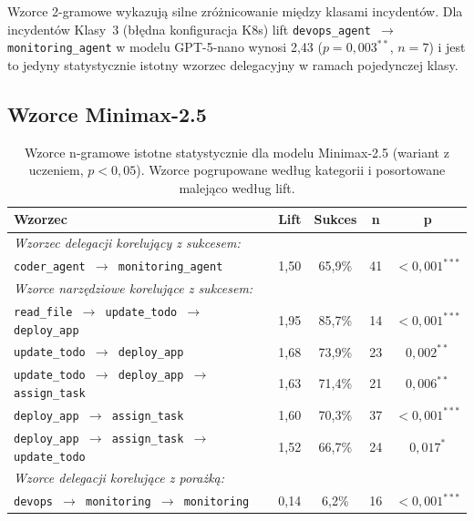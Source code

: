 Wzorce 2-gramowe wykazują silne zróżnicowanie między klasami incydentów. Dla incydentów Klasy~3 (błędna konfiguracja K8s) lift \texttt{devops\_agent $\to$ monitoring\_agent} w modelu GPT-5-nano wynosi 2,43 ($p=0{,}003^{**}$, $n=7$) i jest to jedyny statystycznie istotny wzorzec delegacyjny w ramach pojedynczej klasy.

\subsection{Wzorce Minimax-2.5}
\label{subsec:wzorce-minimax}

\begin{table}[H]
    \centering
    \caption{Wzorce n-gramowe istotne statystycznie dla modelu Minimax-2.5 (wariant z uczeniem, $p < 0{,}05$). Wzorce pogrupowane według kategorii i posortowane malejąco według lift.}
    \label{tab:ngrams-minimax}
    \footnotesize
    \begin{tabular}{p{}cccc}
        \hline
        \textbf{Wzorzec} & \textbf{Lift} & \textbf{Sukces} & \textbf{n} & \textbf{p} \\
        \hline
        \multicolumn{5}{l}{\textit{Wzorzec delegacji korelujący z sukcesem:}} \\[2pt]
        \texttt{coder\_agent $\to$ monitoring\_agent}                    & 1,50 & 65,9\% & 41 & $<0{,}001^{***}$ \\
        \hline
        \multicolumn{5}{l}{\textit{Wzorce narzędziowe korelujące z sukcesem:}} \\[2pt]
        \texttt{read\_file $\to$ update\_todo $\to$ deploy\_app}         & 1,95 & 85,7\% & 14 & $<0{,}001^{***}$ \\
        \texttt{update\_todo $\to$ deploy\_app}                          & 1,68 & 73,9\% & 23 & $0{,}002^{**}$ \\
        \texttt{update\_todo $\to$ deploy\_app $\to$ assign\_task}       & 1,63 & 71,4\% & 21 & $0{,}006^{**}$ \\
        \texttt{deploy\_app $\to$ assign\_task}                          & 1,60 & 70,3\% & 37 & $<0{,}001^{***}$ \\
        \texttt{deploy\_app $\to$ assign\_task $\to$ update\_todo}       & 1,52 & 66,7\% & 24 & $0{,}017^{*}$ \\
        \hline
        \multicolumn{5}{l}{\textit{Wzorce delegacji korelujące z porażką:}} \\[2pt]
        \texttt{devops $\to$ monitoring $\to$ monitoring}                & 0,14 & 6,2\%  & 16 & $<0{,}001^{***}$ \\

\end{tabular}
\end{table}
